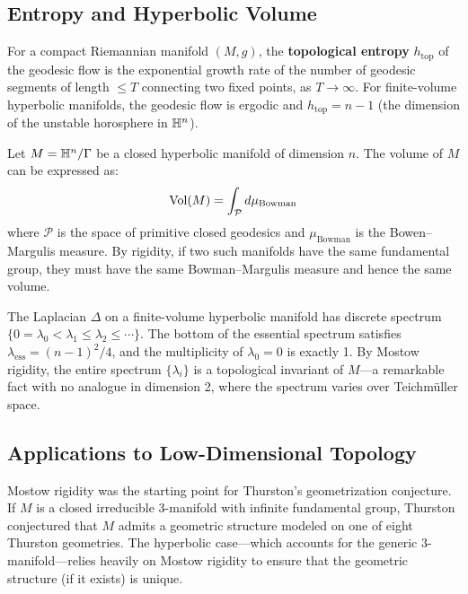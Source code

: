 \subsection{Entropy and Hyperbolic Volume}

\begin{definition}
For a compact Riemannian manifold $(M, g)$, the \textbf{topological entropy} $h_{\mathrm{top}}$ of the geodesic flow is the exponential growth rate of the number of geodesic segments of length $\leq T$ connecting two fixed points, as $T \to \infty$. For finite-volume hyperbolic manifolds, the geodesic flow is ergodic and $h_{\mathrm{top}} = n-1$ (the dimension of the unstable horosphere in $\mathbb{H}^n$).
\end{definition}

\begin{theorem}
Let $M = \mathbb{H}^n/\Gamma$ be a closed hyperbolic manifold of dimension $n$. The volume of $M$ can be expressed as:
\[
\operatorname{Vol}(M) = \int_{\mathcal{P}} d\mu_{\mathrm{Bowman}}
\]
where $\mathcal{P}$ is the space of primitive closed geodesics and $\mu_{\mathrm{Bowman}}$ is the Bowen--Margulis measure. By rigidity, if two such manifolds have the same fundamental group, they must have the same Bowman--Margulis measure and hence the same volume.
\end{theorem}

\begin{remark}
The Laplacian $\Delta$ on a finite-volume hyperbolic manifold has discrete spectrum $\{0 = \lambda_0 < \lambda_1 \leq \lambda_2 \leq \cdots\}$. The bottom of the essential spectrum satisfies $\lambda_{\mathrm{ess}} = (n-1)^2/4$, and the multiplicity of $\lambda_0 = 0$ is exactly 1. By Mostow rigidity, the entire spectrum $\{\lambda_i\}$ is a topological invariant of $M$---a remarkable fact with no analogue in dimension 2, where the spectrum varies over Teichm\"uller space.
\end{remark}

\subsection{Applications to Low-Dimensional Topology}

\begin{remark}
Mostow rigidity was the starting point for Thurston's geometrization conjecture. If $M$ is a closed irreducible 3-manifold with infinite fundamental group, Thurston conjectured that $M$ admits a geometric structure modeled on one of eight Thurston geometries. The hyperbolic case---which accounts for the generic 3-manifold---relies heavily on Mostow rigidity to ensure that the geometric structure (if it exists) is unique.
\end{remark}

